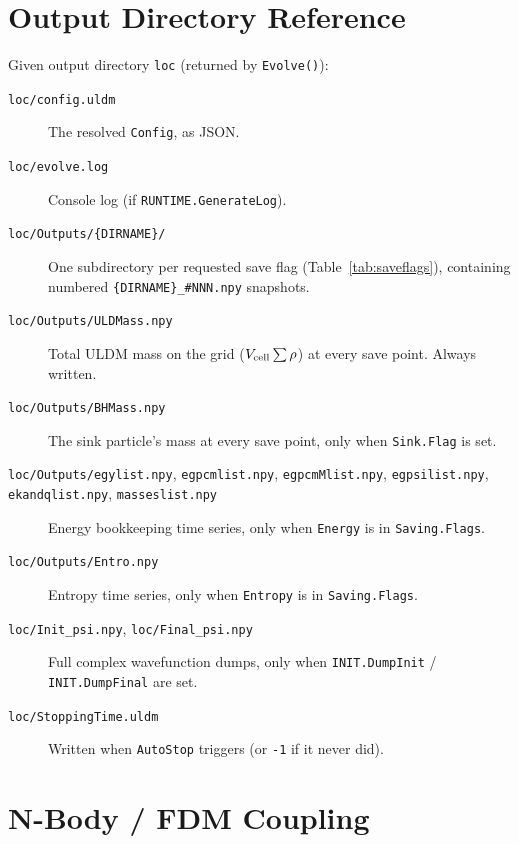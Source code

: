 \documentclass[11pt]{article}
\newcommand{\code}[1]{\texttt{#1}}
\newcommand{\field}[1]{\texttt{#1}}
\begin{document}
\section{Output Directory Reference}
\label{sec:output}

Given output directory \code{loc} (returned by \code{Evolve()}):
\begin{description}
  \item[\code{loc/config.uldm}] The resolved \code{Config}, as JSON.
  \item[\code{loc/evolve.log}] Console log (if \field{RUNTIME.GenerateLog}).
  \item[\code{loc/Outputs/\{DIRNAME\}/}] One subdirectory per requested save
    flag (Table~\ref{tab:saveflags}), containing numbered
    \code{\{DIRNAME\}\_\#NNN.npy} snapshots.
  \item[\code{loc/Outputs/ULDMass.npy}] Total ULDM mass on the grid
    ($V_{\rm cell}\sum\rho$) at every save point. Always written.
  \item[\code{loc/Outputs/BHMass.npy}] The sink particle's mass at every save
    point, only when \field{Sink.Flag} is set.
  \item[\code{loc/Outputs/egylist.npy}, \code{egpcmlist.npy},
    \code{egpcmMlist.npy}, \code{egpsilist.npy}, \code{ekandqlist.npy},
    \code{masseslist.npy}] Energy bookkeeping time series, only when
    \field{Energy} is in \field{Saving.Flags}.
  \item[\code{loc/Outputs/Entro.npy}] Entropy time series, only when
    \field{Entropy} is in \field{Saving.Flags}.
  \item[\code{loc/Init\_psi.npy}, \code{loc/Final\_psi.npy}] Full complex
    wavefunction dumps, only when \field{INIT.DumpInit} /
    \field{INIT.DumpFinal} are set.
  \item[\code{loc/StoppingTime.uldm}] Written when \field{AutoStop} triggers
    (or \code{-1} if it never did).
\end{description}

\section{N-Body / FDM Coupling}
\label{sec:nbody}
\end{document}

